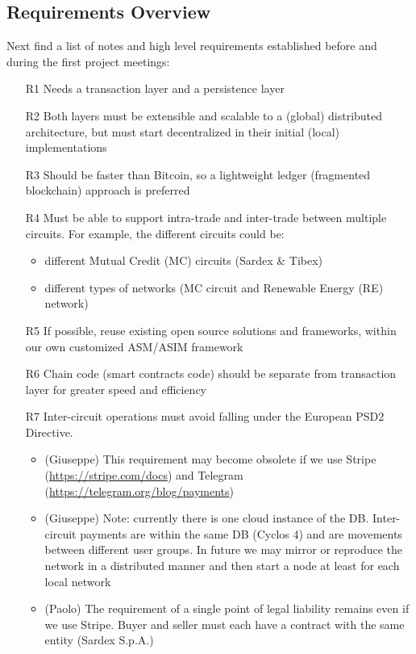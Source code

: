 \subsection{Requirements Overview}\label{_requirements_overview}

Next find a list of notes and high level requirements established before and during the first project meetings:

\begin{itemize}

\item[R1] Needs a transaction layer and a persistence layer

\item[R2] Both layers must be extensible and scalable to a (global) distributed architecture, but must start decentralized in their initial (local) implementations

\item[R3] Should be faster than Bitcoin, so a lightweight ledger (fragmented blockchain) approach is preferred

\item[R4] Must be able to support intra-trade and inter-trade between multiple circuits. For example, the different circuits could be:
\begin{itemize}
	\item {different Mutual Credit (MC) circuits (Sardex \& Tibex)}
	\item {different types of networks (MC circuit and Renewable Energy (RE) network)}
\end{itemize}


\item[R5] If possible, reuse existing open source solutions and frameworks, within our own
customized ASM/ASIM framework

\item[R6] Chain code (smart contracts code) should be separate from transaction layer for greater speed and efficiency

\item[R7] Inter-circuit operations must avoid falling under the European PSD2 Directive.
\begin{itemize}
	\item (Giuseppe) This requirement may become obsolete if we use Stripe (\url{https://stripe.com/docs}) and Telegram (\url{https://telegram.org/blog/payments})
	\item (Giuseppe) Note: currently there is one cloud instance of the DB. Inter-circuit payments are within the same DB (Cyclos 4) and are movements between different user groups. In future we may mirror or reproduce the network in a distributed manner and then start a node at least for each local network
	\item (Paolo) The requirement of a single point of legal liability remains even if we use
Stripe. Buyer and seller must each have a contract with the same entity (Sardex
S.p.A.)
\end{itemize}



\end{itemize}
